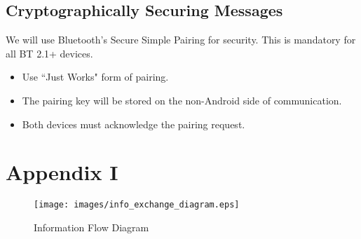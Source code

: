 \documentclass[12pt,letterpaper]{article}
\begin{document}
\subsection{Cryptographically Securing Messages}
We will use Bluetooth's Secure Simple Pairing for security. This is mandatory for all BT 2.1+ devices.

\begin{itemize}
	\item Use ``Just Works" form of pairing.
	\item The pairing key will be stored on the non-Android side of communication.
	\item Both devices must acknowledge the pairing request.
\end{itemize}

\newpage

\section{Appendix I}
\begin{figure}[!ht]
\centering
\texttt{[image: images/info\_exchange\_diagram.eps]}
\caption{Information Flow Diagram}
\label{fig: image}
\end{figure}
\end{document}
